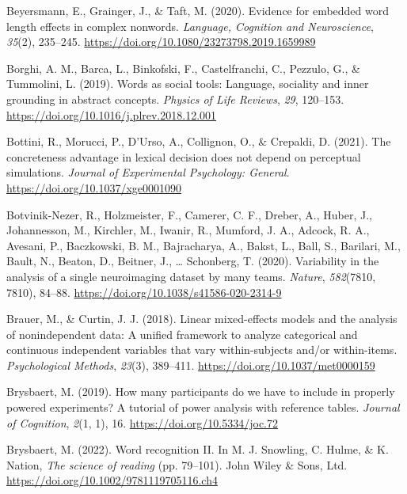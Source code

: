 \documentclass[
  12pt,
  man,floatsintext]{apa7}
\newlength{\cslhangindent}
\newlength{\cslentryspacingunit} %
\newenvironment{CSLReferences}[2] %
 {%
  \setlength{\parindent}{0pt}
  \ifodd #1
  \let\oldpar\par
  \def\par{\hangindent=\cslhangindent\oldpar}
  \fi
  \setlength{\parskip}{#2\cslentryspacingunit}
 }%
 {}
\begin{document}
\begin{CSLReferences}{1}{0}
\leavevmode{}%
Beyersmann, E., Grainger, J., \& Taft, M. (2020). Evidence for embedded word length effects in complex nonwords. \emph{Language, Cognition and Neuroscience}, \emph{35}(2), 235--245. \url{https://doi.org/10.1080/23273798.2019.1659989}

\leavevmode{}%
Borghi, A. M., Barca, L., Binkofski, F., Castelfranchi, C., Pezzulo, G., \& Tummolini, L. (2019). Words as social tools: {Language}, sociality and inner grounding in abstract concepts. \emph{Physics of Life Reviews}, \emph{29}, 120--153. \url{https://doi.org/10.1016/j.plrev.2018.12.001}

\leavevmode{}%
Bottini, R., Morucci, P., D'Urso, A., Collignon, O., \& Crepaldi, D. (2021). The concreteness advantage in lexical decision does not depend on perceptual simulations. \emph{Journal of Experimental Psychology: General}. \url{https://doi.org/10.1037/xge0001090}

\leavevmode{}%
Botvinik-Nezer, R., Holzmeister, F., Camerer, C. F., Dreber, A., Huber, J., Johannesson, M., Kirchler, M., Iwanir, R., Mumford, J. A., Adcock, R. A., Avesani, P., Baczkowski, B. M., Bajracharya, A., Bakst, L., Ball, S., Barilari, M., Bault, N., Beaton, D., Beitner, J., \ldots{} Schonberg, T. (2020). Variability in the analysis of a single neuroimaging dataset by many teams. \emph{Nature}, \emph{582}(7810, 7810), 84--88. \url{https://doi.org/10.1038/s41586-020-2314-9}

\leavevmode{}%
Brauer, M., \& Curtin, J. J. (2018). Linear mixed-effects models and the analysis of nonindependent data: {A} unified framework to analyze categorical and continuous independent variables that vary within-subjects and/or within-items. \emph{Psychological Methods}, \emph{23}(3), 389--411. \url{https://doi.org/10.1037/met0000159}

\leavevmode{}%
Brysbaert, M. (2019). How many participants do we have to include in properly powered experiments? {A} tutorial of power analysis with reference tables. \emph{Journal of Cognition}, \emph{2}(1, 1), 16. \url{https://doi.org/10.5334/joc.72}

\leavevmode{}%
Brysbaert, M. (2022). Word recognition {II}. In M. J. Snowling, C. Hulme, \& K. Nation, \emph{The science of reading} (pp. 79--101). {John Wiley \& Sons, Ltd}. \url{https://doi.org/10.1002/9781119705116.ch4}


\end{CSLReferences}
\end{document}
